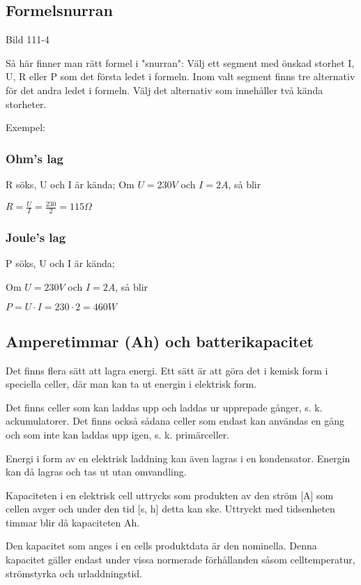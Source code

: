 \subsection{Formelsnurran}

Bild 111-4

Så här finner man rätt formel i "snurran":
Välj ett segment med önskad storhet I, U, R
eller P som det första ledet i formeln. Inom
valt segment finns tre alternativ för det andra
ledet i formeln. Välj det alternativ som innehåller två kända storheter.

Exempel:

\subsubsection{Ohm's lag}

R söks, U och I är kända;
Om $U = 230 V$ och $I = 2 A$, så blir

$R=\frac{U}{I}=\frac{230}{2}=115 \Omega$

\subsubsection{Joule's lag}

P söks, U och I är kända;

Om $U = 230 V$ och $I = 2 A$, så blir

$P = U \cdot I = 230 \cdot 2 = 460 W$

\subsection{Amperetimmar (Ah) och batterikapacitet}

Det finns flera sätt att lagra energi. Ett sätt är att göra det i kemisk form i speciella
celler, där man kan ta ut energin i elektrisk form.

Det finns celler som kan laddas upp och laddas ur upprepade gånger, s. k. ackumulatorer.
Det finns också sådana celler som endast kan användas en gång och som inte
kan laddas upp igen, s. k. primärceller.

Energi i form av en elektrisk laddning kan även lagras i en kondensator. Energin kan
då lagras och tas ut utan omvandling.


Kapaciteten i en elektrisk cell uttrycks som produkten av den ström [A] som
cellen avger och under den tid [s, h] detta kan ske.
Uttryckt med tidsenheten timmar blir då kapaciteten Ah.


Den kapacitet som anges i en cells produktdata är den nominella. Denna kapacitet
gäller endast under vissa normerade förhållanden såsom celltemperatur, strömstyrka
och urladdningstid.

